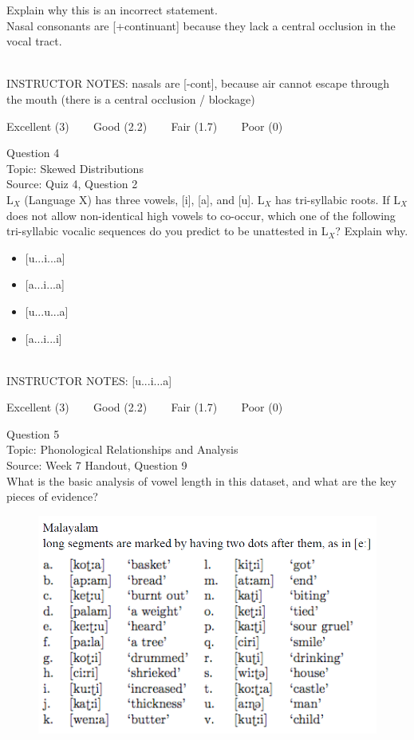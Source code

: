 \documentclass[12pt]{article}
\begin{document}
Explain why this is an incorrect statement.\\

Nasal consonants are {[+continuant]} because they lack a central occlusion in the vocal tract.


~\\
INSTRUCTOR NOTES: nasals are [-cont], because air cannot escape through the mouth (there is a central occlusion / blockage)


\vfill
Excellent (3) ~~~ Good (2.2) ~~~ Fair (1.7) ~~~ Poor (0)
\newpage

{\large Question 4}\\

Topic: Skewed Distributions\\
Source: Quiz 4, Question 2\\

L$_X$ (Language X) has three vowels, [i], [a], and [u]. L$_X$ has tri-syllabic roots. If L$_X$ does not allow non-identical high vowels to co-occur, which one of the following tri-syllabic vocalic sequences do you predict to be unattested in L$_X$? Explain why.\\

\begin{itemize} \item {[u...i...a]} \item {[a...i...a]} \item {[u...u...a]} \item {[a...i...i]} \end{itemize}


~\\
INSTRUCTOR NOTES: [u...i...a]


\vfill
Excellent (3) ~~~ Good (2.2) ~~~ Fair (1.7) ~~~ Poor (0)
\newpage

{\large Question 5}\\

Topic: Phonological Relationships and Analysis\\
Source: Week 7 Handout, Question 9\\

What is the basic analysis of vowel length in this dataset, and what are the key pieces of evidence?\\

\begin{figure}[H]
\includegraphics{../images/malayalam.png}
\end{figure}
\end{document}
